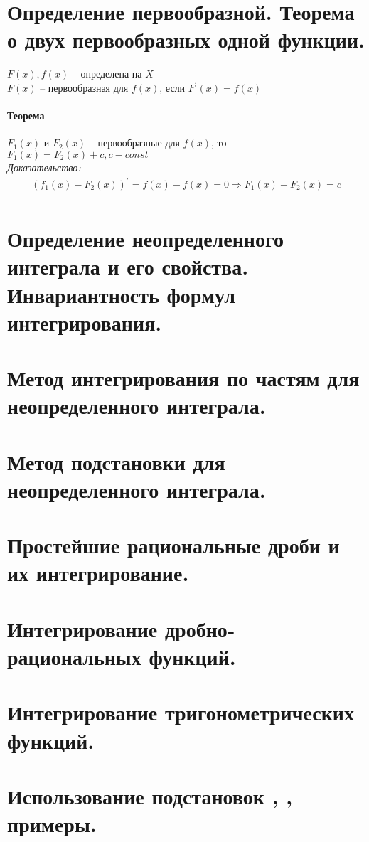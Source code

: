 \documentclass[12pt, fleqn]{article}
\begin{document}
\section{Определение первообразной. Теорема о двух первообразных одной функции.}
$F(x), f(x)$ -- определена на $X$\\
$F(x)$ -- первообразная для $f(x)$, если $F^\prime(x)=f(x)$
\paragraph{Теорема} $F_1(x)$ и $F_2(x)$ -- первообразные для $f(x)$, то $F_1(x)=F_2(x)+c, c - const$\\
\textit{Доказательство:}
\begin{multline*}
	\left(f_1(x)-F_2(x)\right)^\prime=f(x)-f(x)=0 \Rightarrow F_1(x)-F_2(x)= c\\
\end{multline*}
\section{Определение неопределенного интеграла и его свойства. Инвариантность формул интегрирования.}
\section{Метод интегрирования по частям для неопределенного интеграла.}
\section{Метод подстановки для неопределенного интеграла.}
\section{Простейшие рациональные дроби и их интегрирование.}
\section{Интегрирование дробно-рациональных функций.}
\section{Интегрирование тригонометрических функций.}
\section{Использование подстановок ,  , примеры.}
\end{document}
